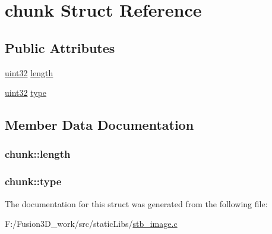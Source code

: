 \hypertarget{structchunk}{}\section{chunk Struct Reference}
\label{structchunk}
\subsection*{Public Attributes}
\begin{DoxyCompactItemize}
\item 
\hyperlink{stb__image_8c_a1134b580f8da4de94ca6b1de4d37975e}{uint32} \hyperlink{structchunk_a0b5cc0c5a9b91945c42373db2a499fb1}{length}
\item 
\hyperlink{stb__image_8c_a1134b580f8da4de94ca6b1de4d37975e}{uint32} \hyperlink{structchunk_a05d5489f3807bc7ba149c1904241d087}{type}
\end{DoxyCompactItemize}


\subsection{Member Data Documentation}
\hypertarget{structchunk_a0b5cc0c5a9b91945c42373db2a499fb1}{}
\subsubsection[{length}]{ chunk\+::length}\label{structchunk_a0b5cc0c5a9b91945c42373db2a499fb1}
\hypertarget{structchunk_a05d5489f3807bc7ba149c1904241d087}{}
\subsubsection[{type}]{ chunk\+::type}\label{structchunk_a05d5489f3807bc7ba149c1904241d087}


The documentation for this struct was generated from the following file\+:\begin{DoxyCompactItemize}
\item 
F\+:/\+Fusion3\+D\+\_\+work/src/static\+Libs/\hyperlink{stb__image_8c}{stb\+\_\+image.\+c}\end{DoxyCompactItemize}
